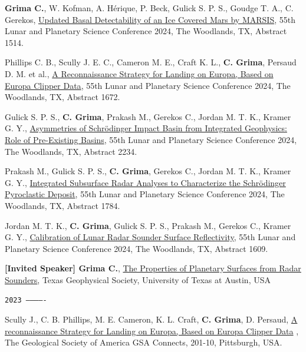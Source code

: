 \begin{etaremune}
\item
    \textbf{Grima C.}, W. Kofman, A. Hérique, P. Beck, Gulick S. P. S., Goudge T. A., C. Gerekos, \href{https://www.hou.usra.edu/meetings/lpsc2024/pdf/1514.pdf}{Updated Basal Detectability of an Ice Covered Mars by MARSIS}, 55th Lunar and Planetary Science Conference 2024, The Woodlands, TX, Abstract 1514.

\item
     Phillips C. B., Scully J. E. C., Cameron M. E., Craft K. L., \textbf{C. Grima}, Persaud D. M. et al., \href{https://www.hou.usra.edu/meetings/lpsc2024/pdf/1672.pdf}{A Reconnaissance Strategy for Landing on Europa, Based on Europa Clipper Data}, 55th Lunar and Planetary Science Conference 2024, The Woodlands, TX, Abstract 1672.

\item
     Gulick S. P. S., \textbf{C. Grima}, Prakash M., Gerekos C., Jordan M. T. K., Kramer G. Y., \href{https://www.hou.usra.edu/meetings/lpsc2024/pdf/2234.pdf}{Asymmetries of Schrödinger Impact Basin from Integrated Geophysics: Role of Pre-Existing Basins}, 55th Lunar and Planetary Science Conference 2024, The Woodlands, TX, Abstract 2234.

\item
     Prakash M., Gulick S. P. S., \textbf{C. Grima}, Gerekos C., Jordan M. T. K., Kramer G. Y., \href{https://www.hou.usra.edu/meetings/lpsc2024/pdf/1784.pdf}{Integrated Subsurface Radar Analyses to Characterize the Schrödinger Pyroclastic Deposit}, 55th Lunar and Planetary Science Conference 2024, The Woodlands, TX, Abstract 1784.

\item
     Jordan M. T. K., \textbf{C. Grima}, Gulick S. P. S., Prakash M., Gerekos C., Kramer G. Y., \href{https://www.hou.usra.edu/meetings/lpsc2024/pdf/1609.pdf}{Calibration of Lunar Radar Sounder Surface Reflectivity}, 55th Lunar and Planetary Science Conference 2024, The Woodlands, TX, Abstract 1609.

\item
    \textbf{[Invited Speaker] Grima C.}, \href{}{The Properties of Planetary Surfaces from Radar Sounders}, Texas Geophysical Society, University of Texas at Austin, USA

\hspace{-2em}\texttt{2023 -------------}

\item
    Scully J., C. B. Phillips, M. E. Cameron, K. L. Craft, \textbf{C. Grima}, D. Persaud, \href{https://gsa.confex.com/gsa/2023AM/meetingapp.cgi/Paper/393517}{A reconnaissance Strategy for Landing on Europa, Based on Europa Clipper Data} , The Geological Society of America GSA Connects, 201-10, Pittsburgh, USA.


\end{etaremune}
